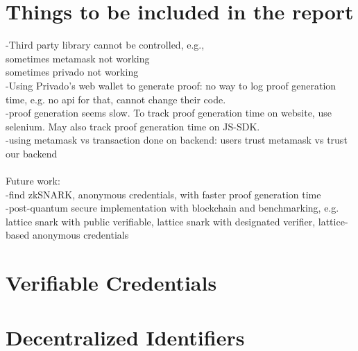 \documentclass[12pt]{article}
\date{13th Dec 2024}
\theoremstyle{definition}
\begin{document}

\tableofcontents
\newpage
\section{Things to be included in the report} \label{Introduction}
-Third party library cannot be controlled, e.g., \\
sometimes metamask not working\\
sometimes privado not working\\
-Using Privado's web wallet to generate proof: no way to log proof generation time, e.g. no api for that, cannot change their code.\\
-proof generation seems slow. To track proof generation time on website, use selenium. May also track proof generation time on JS-SDK.\\
-using metamask vs transaction done on backend: users trust metamask vs trust our backend\\
\\
Future work:\\
-find zkSNARK, anonymous credentials, with faster proof generation time\\
-post-quantum secure implementation with blockchain and benchmarking, e.g. lattice snark with public verifiable, lattice snark with designated verifier, lattice-based anonymous credentials\\

\section{Verifiable Credentials}\label{sec:vc}

\section{Decentralized Identifiers}\label{sec:did}
\end{document}
